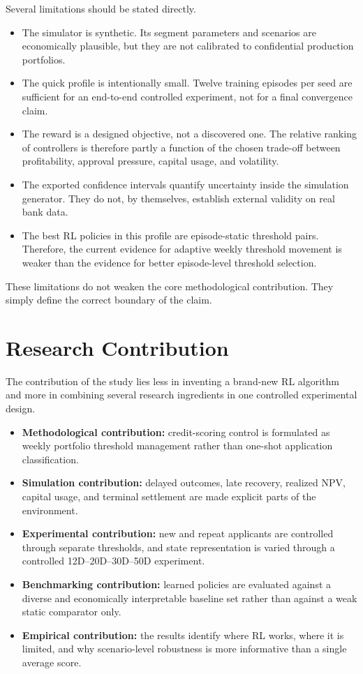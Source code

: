 \documentclass[12pt,a4paper]{article}
\begin{document}
Several limitations should be stated directly.
\begin{itemize}[leftmargin=*]
    \item The simulator is synthetic. Its segment parameters and scenarios are economically plausible, but they are not calibrated to confidential production portfolios.
    \item The quick profile is intentionally small. Twelve training episodes per seed are sufficient for an end-to-end controlled experiment, not for a final convergence claim.
    \item The reward is a designed objective, not a discovered one. The relative ranking of controllers is therefore partly a function of the chosen trade-off between profitability, approval pressure, capital usage, and volatility.
    \item The exported confidence intervals quantify uncertainty inside the simulation generator. They do not, by themselves, establish external validity on real bank data.
    \item The best RL policies in this profile are episode-static threshold pairs. Therefore, the current evidence for adaptive weekly threshold movement is weaker than the evidence for better episode-level threshold selection.
\end{itemize}

These limitations do not weaken the core methodological contribution. They simply define the correct boundary of the claim.

\section{Research Contribution}

The contribution of the study lies less in inventing a brand-new RL algorithm and more in combining several research ingredients in one controlled experimental design.
\begin{itemize}[leftmargin=*]
    \item \textbf{Methodological contribution:} credit-scoring control is formulated as weekly portfolio threshold management rather than one-shot application classification.
    \item \textbf{Simulation contribution:} delayed outcomes, late recovery, realized NPV, capital usage, and terminal settlement are made explicit parts of the environment.
    \item \textbf{Experimental contribution:} new and repeat applicants are controlled through separate thresholds, and state representation is varied through a controlled 12D--20D--30D--50D experiment.
    \item \textbf{Benchmarking contribution:} learned policies are evaluated against a diverse and economically interpretable baseline set rather than against a weak static comparator only.
    \item \textbf{Empirical contribution:} the results identify where RL works, where it is limited, and why scenario-level robustness is more informative than a single average score.
\end{itemize}
\end{document}
